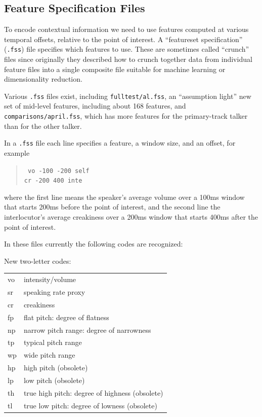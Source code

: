 \documentclass[11pt]{article}
\begin{document}
\subsection{Feature Specification Files}     \label{featurespec-files}

To encode contextual information we need to use features computed at
various temporal offsets, relative to the point of interest.  A
``featureset specification'' ({\tt .fss}) file specifies which
features to use.  These are sometimes called ``crunch'' files since
originally they described how to crunch together data from individual
feature files into a single composite file suitable for machine
learning or dimensionality reduction.

Various {\tt .fss} files exist, including {\tt fulltest/al.fss}, an
``assumption light'' new set of mid-level features, including about
168 features, and {\tt comparisons/april.fss}, which has more features
for the primary-track talker than for the other talker. 


In a {\tt .fss} file each line specifies a feature, a window size, and
an offset, for example

\begin{quote}{\tt 
    vo   -100   -200 self  \\
    cr   -200    400 inte
}\end{quote}

where the first line means the speaker's average volume over a 100ms
window that starts 200ms before the point of interest, and the second
line the interlocutor's average creakiness over a 200ms window that
starts 400ms after the point of interest.  

In these files currently the following codes are recognized:

New two-letter codes: 

\begin{tabular}{ll}
  vo  & intensity/volume \\
  sr  & speaking rate proxy \\
  cr  & creakiness \\
  fp  & flat pitch: degree of flatness \\
  np  & narrow pitch range: degree of narrowness \\
  tp  & typical pitch range \\
  wp  & wide pitch range  \\
  hp  & high pitch (obsolete) \\ 
  lp  & low pitch (obsolete) \\
  th  & true high pitch: degree of highness (obsolete) \\ 
  tl  & true low pitch: degree of lowness (obsolete) \\
\end{tabular}
\end{document}
